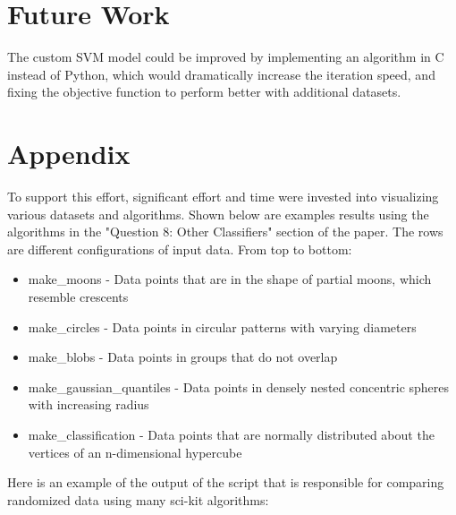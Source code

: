 \documentclass[letterpaper]{article}
\begin{document}
\section{Future Work}
The custom SVM model could be improved by implementing an algorithm in C instead of Python, which would dramatically increase the iteration speed, and fixing the objective function to perform better with additional datasets.

\nocite{github2019}
\nocite{svm2019}
\nocite{svm2025}
\nocite{svmkernel2023}



\newpage

\section{Appendix}
To support this effort, significant effort and time were invested into visualizing various datasets and algorithms. Shown below are examples results using the algorithms in the "Question 8: Other Classifiers" section of the paper. The rows are different configurations of input data. From top to bottom:
\begin{itemize}
    \item make\_moons - Data points that are in the shape of partial moons, which resemble crescents
    \item make\_circles - Data points in circular patterns with varying diameters
    \item make\_blobs - Data points in groups that do not overlap
    \item make\_gaussian\_quantiles - Data points in densely nested concentric spheres with increasing radius
    \item make\_classification - Data points that are normally distributed about the vertices of an n-dimensional hypercube
\end{itemize}

Here is an example of the output of the script that is responsible for comparing randomized data using many sci-kit algorithms:
\end{document}
